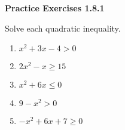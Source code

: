 \vspace{1ex}
\noindent\textbf{Practice Exercises 1.8.1}

\vspace{0.75ex}

Solve each quadratic inequality. 

\begin{enumerate}[label = \color{blue}\arabic*. ]
\item $ x^{2} + 3x - 4 > 0 $
\item $ 2x^{2} - x \geq 15 $
\item $ x^{2} + 6x \leq 0 $
\item $ 9 - x^{2} > 0 $
\item $ -x^{2} + 6x + 7 \geq 0 $
\end{enumerate}
